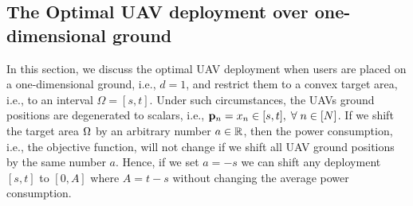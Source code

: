 \documentclass[smallabstract,smallcaptions]{dccpaper}
\newcommand{\philippstart}{\color{black}}
\newcommand{\philippend}{\color{black}}
\begin{document}
\fi %

\subsection{The Optimal UAV deployment over one-dimensional ground}

In this section, we discuss the optimal UAV deployment when users are placed on a one-dimensional ground, i.e., $d=1$,
and restrict them to a convex target area, i.e., to an interval $\Omega = [s,t]$.  Under such circumstances, the UAVs
ground positions are degenerated to scalars, i.e., $\vp_n=x_n\in[s, t], \forall n\in[N]$.  \philippstart If we shift the
target area $\Omega$ by an arbitrary number $a\in{\ensuremath{\mathbb R}}$, then the power consumption, i.e., the objective function, will not
change if we shift all UAV ground positions by the same number $a$. Hence, if we set $a=-s$ we can shift any deployment
$[s,t]$ to $[0,A]$ where $A=t-s$ without changing the average power consumption.   \philippend
\end{document}
